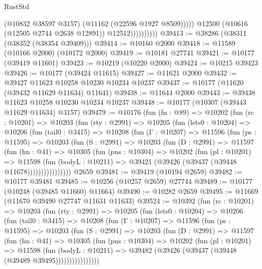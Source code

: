 \begin{lexlean}{RustStd}
\begin{coremodule}
                              (@10832 @38597 @3157)
                              (@11162 (@22596 @1927 @8509)))))
                        @12500
                        (@10616 (@12505 @2744 @2638 @12891))
                        @12512))))))))))
@39413 := @38286 (@38311 (@38352 (@38354 @39409)))
@39414 := @10160 @2000
@39418 := @11589 (@10166 @2000) (@10172 @2000)
@39419 := @10181 @27741
@39421 := @10177 (@39419 @11601)
@39423 := @10219 (@10220 @2000)
@39424 := @10215 @39423
@39426 := @10177 (@39424 @11615)
@39427 := @11621 @2000
@39432 := @39427 @11623 @10258 @10230 @10234 @10237
@39437 := @10177 (@11620 (@39432 @11629 @11634) @11641)
@39438 := @11644 @2000
@39443 := @39438 @11623 @10258 @10230 @10234 @10237
@39448 := @10177 (@10307 (@39443 @11629 @11634) @3157)
@39479 := @10176
    (fun (fn : @89) =>
    @10202
      (fun (rc : @10201) =>
      @10203
        (fun (rty : @2991) =>
        @10205
          (fun (lets0 : @10204) =>
          @10206
            (fun (tail0 : @3415) =>
            @10208
              (fun (Γ : @10207) =>
              @11596
                (fun (ps : @11595) =>
                @10203
                  (fun (S : @2991) =>
                  @10203
                    (fun (D : @2991) =>
                    @11597
                      (fun (hn : @41) =>
                      @10305
                        (fun (pns : @10304) =>
                        @10202
                          (fun (pl : @10201) =>
                          @11598
                            (fun (bodyL : @10211) =>
                            @39421 (@39426 (@39437 (@39448 @11678))))))))))))))))
    @2659
@39481 := @39419 (@10194 @2659)
@39482 := @10177 @39481
@39485 := @10256 (@10257 @2659) @27744
@39489 := @10177 (@10248 (@39485 @11660) @11664)
@39490 := @10282 @2659
@39495 := @11669 (@11670 @39490 @27747 @11631 @11633)
@39524 := @10392
    (fun (rc : @10201) =>
    @10203
      (fun (rty : @2991) =>
      @10205
        (fun (lets0 : @10204) =>
        @10206
          (fun (tail0 : @3415) =>
          @10208
            (fun (Γ : @10207) =>
            @11596
              (fun (ps : @11595) =>
              @10203
                (fun (S : @2991) =>
                @10203
                  (fun (D : @2991) =>
                  @11597
                    (fun (hn : @41) =>
                    @10305
                      (fun (pns : @10304) =>
                      @10202
                        (fun (pl : @10201) =>
                        @11598
                          (fun (bodyL : @10211) =>
                          @39482 (@39426 (@39437 (@39448 (@39489 @39495))))))))))))))))

\end{coremodule}
\end{lexlean}

